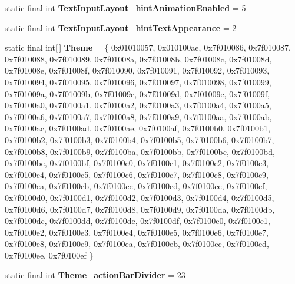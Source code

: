 \begin{DoxyCompactItemize}
\item 
\hypertarget{classandroid_1_1support_1_1design_1_1_r_1_1styleable_a62485d8990046222153bfc36f409acb4}{}static final int {\bfseries Text\+Input\+Layout\+\_\+hint\+Animation\+Enabled} = 5\label{classandroid_1_1support_1_1design_1_1_r_1_1styleable_a62485d8990046222153bfc36f409acb4}

\item 
\hypertarget{classandroid_1_1support_1_1design_1_1_r_1_1styleable_a2d3b7ce259d0043d39a949a759dd729d}{}static final int {\bfseries Text\+Input\+Layout\+\_\+hint\+Text\+Appearance} = 2\label{classandroid_1_1support_1_1design_1_1_r_1_1styleable_a2d3b7ce259d0043d39a949a759dd729d}

\item 
\hypertarget{classandroid_1_1support_1_1design_1_1_r_1_1styleable_aa86541ba8c09e8617ceab748534cb22f}{}static final int\mbox{[}$\,$\mbox{]} {\bfseries Theme} = \{ 0x01010057, 0x010100ae, 0x7f010086, 0x7f010087, 0x7f010088, 0x7f010089, 0x7f01008a, 0x7f01008b, 0x7f01008c, 0x7f01008d, 0x7f01008e, 0x7f01008f, 0x7f010090, 0x7f010091, 0x7f010092, 0x7f010093, 0x7f010094, 0x7f010095, 0x7f010096, 0x7f010097, 0x7f010098, 0x7f010099, 0x7f01009a, 0x7f01009b, 0x7f01009c, 0x7f01009d, 0x7f01009e, 0x7f01009f, 0x7f0100a0, 0x7f0100a1, 0x7f0100a2, 0x7f0100a3, 0x7f0100a4, 0x7f0100a5, 0x7f0100a6, 0x7f0100a7, 0x7f0100a8, 0x7f0100a9, 0x7f0100aa, 0x7f0100ab, 0x7f0100ac, 0x7f0100ad, 0x7f0100ae, 0x7f0100af, 0x7f0100b0, 0x7f0100b1, 0x7f0100b2, 0x7f0100b3, 0x7f0100b4, 0x7f0100b5, 0x7f0100b6, 0x7f0100b7, 0x7f0100b8, 0x7f0100b9, 0x7f0100ba, 0x7f0100bb, 0x7f0100bc, 0x7f0100bd, 0x7f0100be, 0x7f0100bf, 0x7f0100c0, 0x7f0100c1, 0x7f0100c2, 0x7f0100c3, 0x7f0100c4, 0x7f0100c5, 0x7f0100c6, 0x7f0100c7, 0x7f0100c8, 0x7f0100c9, 0x7f0100ca, 0x7f0100cb, 0x7f0100cc, 0x7f0100cd, 0x7f0100ce, 0x7f0100cf, 0x7f0100d0, 0x7f0100d1, 0x7f0100d2, 0x7f0100d3, 0x7f0100d4, 0x7f0100d5, 0x7f0100d6, 0x7f0100d7, 0x7f0100d8, 0x7f0100d9, 0x7f0100da, 0x7f0100db, 0x7f0100dc, 0x7f0100dd, 0x7f0100de, 0x7f0100df, 0x7f0100e0, 0x7f0100e1, 0x7f0100e2, 0x7f0100e3, 0x7f0100e4, 0x7f0100e5, 0x7f0100e6, 0x7f0100e7, 0x7f0100e8, 0x7f0100e9, 0x7f0100ea, 0x7f0100eb, 0x7f0100ec, 0x7f0100ed, 0x7f0100ee, 0x7f0100ef \}\label{classandroid_1_1support_1_1design_1_1_r_1_1styleable_aa86541ba8c09e8617ceab748534cb22f}

\item 
\hypertarget{classandroid_1_1support_1_1design_1_1_r_1_1styleable_af2c082df41c007212f1ed79a691bc5c6}{}static final int {\bfseries Theme\+\_\+action\+Bar\+Divider} = 23\label{classandroid_1_1support_1_1design_1_1_r_1_1styleable_af2c082df41c007212f1ed79a691bc5c6}


\end{DoxyCompactItemize}
